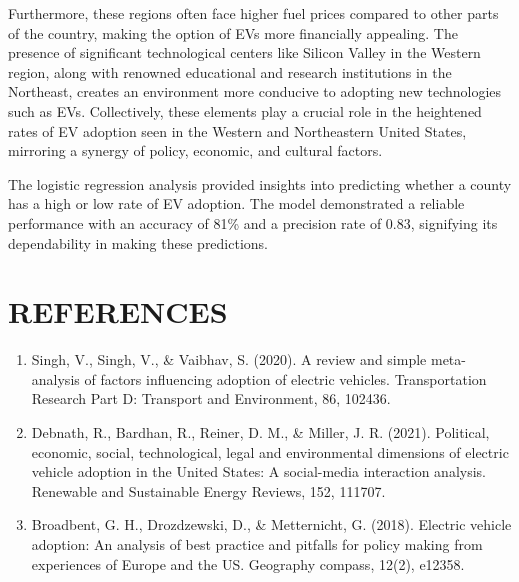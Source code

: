 \documentclass[
  letterpaper,
  DIV=11,
  numbers=noendperiod]{scrartcl}
\begin{document}
Furthermore, these regions often face higher fuel prices compared to
other parts of the country, making the option of EVs more financially
appealing. The presence of significant technological centers like
Silicon Valley in the Western region, along with renowned educational
and research institutions in the Northeast, creates an environment more
conducive to adopting new technologies such as EVs. Collectively, these
elements play a crucial role in the heightened rates of EV adoption seen
in the Western and Northeastern United States, mirroring a synergy of
policy, economic, and cultural factors.

The logistic regression analysis provided insights into predicting
whether a county has a high or low rate of EV adoption. The model
demonstrated a reliable performance with an accuracy of 81\% and a
precision rate of 0.83, signifying its dependability in making these
predictions.

\hypertarget{references}{%
\section{REFERENCES}\label{references}}

\begin{enumerate}
\def\labelenumi{\arabic{enumi})}
\item
  Singh, V., Singh, V., \& Vaibhav, S. (2020). A review and simple
  meta-analysis of factors influencing adoption of electric vehicles.
  Transportation Research Part D: Transport and Environment, 86, 102436.
\item
  Debnath, R., Bardhan, R., Reiner, D. M., \& Miller, J. R. (2021).
  Political, economic, social, technological, legal and environmental
  dimensions of electric vehicle adoption in the United States: A
  social-media interaction analysis. Renewable and Sustainable Energy
  Reviews, 152, 111707.
\item
  Broadbent, G. H., Drozdzewski, D., \& Metternicht, G. (2018). Electric
  vehicle adoption: An analysis of best practice and pitfalls for policy
  making from experiences of Europe and the US. Geography compass,
  12(2), e12358.
\end{enumerate}
\end{document}
